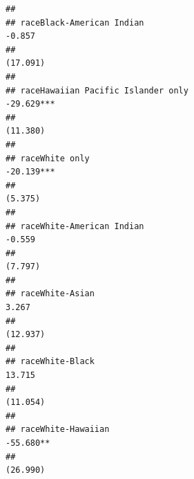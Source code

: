 \documentclass[
]{article}
\begin{document}
\begin{verbatim}
##                                                                                                                              
## raceBlack-American Indian                                                                                  -0.857            
##                                                                                                           (17.091)           
##                                                                                                                              
## raceHawaiian Pacific Islander only                                                                       -29.629***          
##                                                                                                           (11.380)           
##                                                                                                                              
## raceWhite only                                                                                           -20.139***          
##                                                                                                           (5.375)            
##                                                                                                                              
## raceWhite-American Indian                                                                                  -0.559            
##                                                                                                           (7.797)            
##                                                                                                                              
## raceWhite-Asian                                                                                            3.267             
##                                                                                                           (12.937)           
##                                                                                                                              
## raceWhite-Black                                                                                            13.715            
##                                                                                                           (11.054)           
##                                                                                                                              
## raceWhite-Hawaiian                                                                                       -55.680**           
##                                                                                                           (26.990)           

\end{verbatim}
\end{document}
